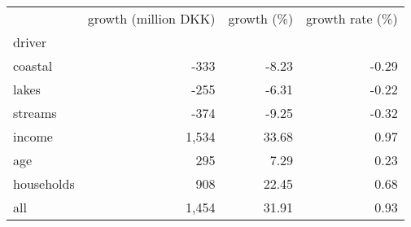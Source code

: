 \begin{tabular}{lrrr}
\toprule
 & growth (million DKK) & growth (\%) & growth rate (\%) \\
driver &  &  &  \\
\midrule
coastal & -333 & -8.23 & -0.29 \\
lakes & -255 & -6.31 & -0.22 \\
streams & -374 & -9.25 & -0.32 \\
income & 1,534 & 33.68 & 0.97 \\
age & 295 & 7.29 & 0.23 \\
households & 908 & 22.45 & 0.68 \\
all & 1,454 & 31.91 & 0.93 \\
\bottomrule
\end{tabular}
